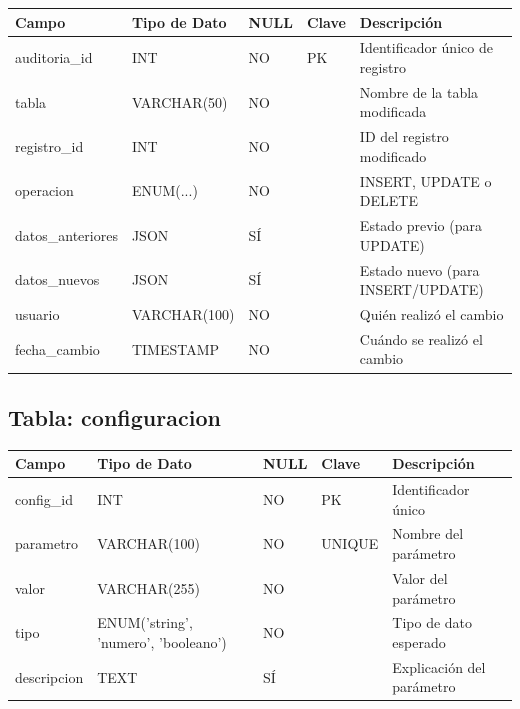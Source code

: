 \begin{center}
\begin{tabular}{|l|l|l|l|p{4cm}|}
    \hline
    \textbf{Campo} & \textbf{Tipo de Dato} & \textbf{NULL} & \textbf{Clave} & \textbf{Descripción} \\
    \hline
    auditoria_id & INT & NO & PK & Identificador único de registro \\
    \hline
    tabla & VARCHAR(50) & NO & & Nombre de la tabla modificada \\
    \hline
    registro_id & INT & NO & & ID del registro modificado \\
    \hline
    operacion & ENUM(...) & NO & & INSERT, UPDATE o DELETE \\
    \hline
    datos_anteriores & JSON & SÍ & & Estado previo (para UPDATE) \\
    \hline
    datos_nuevos & JSON & SÍ & & Estado nuevo (para INSERT/UPDATE) \\
    \hline
    usuario & VARCHAR(100) & NO & & Quién realizó el cambio \\
    \hline
    fecha_cambio & TIMESTAMP & NO & & Cuándo se realizó el cambio \\
    \hline
\end{tabular}
\end{center}


\subsection{Tabla: configuracion}

\begin{center}
\begin{tabular}{|l|l|l|l|p{4cm}|}
    \hline
    \textbf{Campo} & \textbf{Tipo de Dato} & \textbf{NULL} & \textbf{Clave} & \textbf{Descripción} \\
    \hline
    config_id & INT & NO & PK & Identificador único \\
    \hline
    parametro & VARCHAR(100) & NO & UNIQUE & Nombre del parámetro \\
    \hline
    valor & VARCHAR(255) & NO & & Valor del parámetro \\
    \hline
    tipo & ENUM('string', 'numero', 'booleano') & NO & & Tipo de dato esperado \\
    \hline
    descripcion & TEXT & SÍ & & Explicación del parámetro \\
    \hline
\end{tabular}
\end{center}

